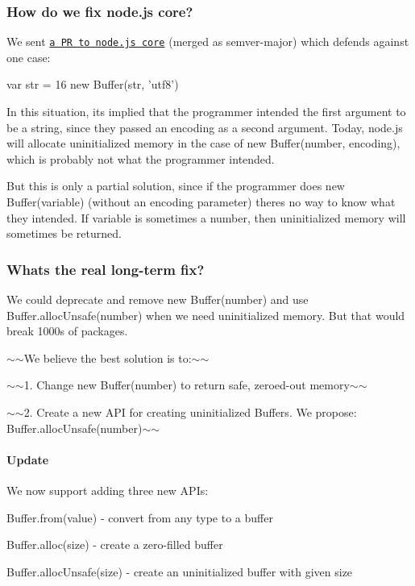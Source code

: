 \subsubsection*{How do we fix node.\+js core?}

We sent \href{https://github.com/nodejs/node/pull/4514}{\tt a PR to node.\+js core} (merged as {\ttfamily semver-\/major}) which defends against one case\+:


\begin{DoxyCode}
var str = 16
new Buffer(str, 'utf8')
\end{DoxyCode}


In this situation, it\textquotesingle{}s implied that the programmer intended the first argument to be a string, since they passed an encoding as a second argument. Today, node.\+js will allocate uninitialized memory in the case of {\ttfamily new Buffer(number, encoding)}, which is probably not what the programmer intended.

But this is only a partial solution, since if the programmer does {\ttfamily new Buffer(variable)} (without an {\ttfamily encoding} parameter) there\textquotesingle{}s no way to know what they intended. If {\ttfamily variable} is sometimes a number, then uninitialized memory will sometimes be returned.

\subsubsection*{What\textquotesingle{}s the real long-\/term fix?}

We could deprecate and remove {\ttfamily new Buffer(number)} and use {\ttfamily Buffer.\+alloc\+Unsafe(number)} when we need uninitialized memory. But that would break 1000s of packages.

$\sim$$\sim$\+We believe the best solution is to\+:$\sim$$\sim$

$\sim$$\sim$1. Change {\ttfamily new Buffer(number)} to return safe, zeroed-\/out memory$\sim$$\sim$

$\sim$$\sim$2. Create a new A\+PI for creating uninitialized Buffers. We propose\+: {\ttfamily Buffer.\+alloc\+Unsafe(number)}$\sim$$\sim$

\paragraph*{Update}

We now support adding three new A\+P\+Is\+:


\begin{DoxyItemize}
\item {\ttfamily Buffer.\+from(value)} -\/ convert from any type to a buffer
\item {\ttfamily Buffer.\+alloc(size)} -\/ create a zero-\/filled buffer
\item {\ttfamily Buffer.\+alloc\+Unsafe(size)} -\/ create an uninitialized buffer with given size
\end{DoxyItemize}

